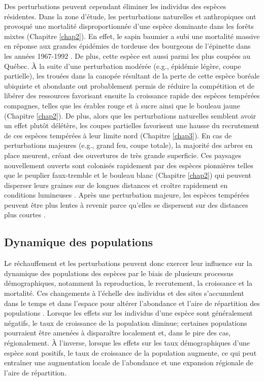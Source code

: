 Des perturbations peuvent cependant éliminer les individus des espèces
résidentes. Dans la zone d'étude, les perturbations naturelles et
anthropiques ont provoqué une mortalité disproportionnée d'une espèce
dominante dans les forêts mixtes (Chapitre \ref{chap2}). En effet, le
sapin baumier a subi une mortalité massive en réponse aux grandes
épidémies de tordeuse des bourgeons de l'épinette dans les années
1967-1992 \citep{duchesne_population_2008}. De plus, cette espèce est
aussi parmi les plus coupées au Québec. À la suite d'une perturbation
modérée (e.g., épidémie légère, coupe partielle), les trouées dans la
canopée résultant de la perte de cette espèce boréale ubiquiste et
abondante ont probablement permis de réduire la compétition et de
libérer des ressources favorisant ensuite la croissance rapide des
espèces tempérées compagnes, telles que les érables rouge et à sucre
ainsi que le bouleau jaune (Chapitre \ref{chap2}). De plus, alors que
les perturbations naturelles semblent avoir un effet plutôt délétère,
les coupes partielles favorisent une hausse du recrutement de ces
espèces tempérées à leur limite nord (Chapitre \ref{chap3}). En cas de
perturbations majeures (e.g., grand feu, coupe totale), la majorité des
arbres en place meurent, créant des ouvertures de très grande
superficie. Ces paysages nouvellement ouverts sont colonisés rapidement
par des espèces pionnières telles que le peuplier faux-tremble et le
bouleau blanc (Chapitre \ref{chap2}) qui peuvent disperser leurs graines
sur de longues distances et croître rapidement en conditions lumineuses
\citep{boucher_fire_2017, grondin_have_2018}. Après une perturbation
majeure, les espèces tempérées peuvent être plus lentes à revenir parce
qu'elles se dispersent sur des distances plus courtes
\citep{scheller_spatially_2005}.

\hypertarget{dynamique-des-populations}{%
\subsection{Dynamique des populations}\label{dynamique-des-populations}}

Le réchauffement et les perturbations peuvent donc exercer leur
influence sur la dynamique des populations des espèces par le biais de
plusieurs processus démographiques, notamment la reproduction, le
recrutement, la croissance et la mortalité. Ces changements à l'échelle
des individus et des sites s'accumulent dans le temps et dans l'espace
pour altérer l'abondance et l'aire de répartition des populations
\citep{holt_theoretical_2005}. Lorsque les effets sur les individus
d'une espèce sont généralement négatifs, le taux de croissance de la
population diminue; certaines populations pourraient être amenées à
disparaître localement et, dans le pire des cas, régionalement. À
l'inverse, lorsque les effets sur les taux démographiques d'une espèce
sont positifs, le taux de croissance de la population augmente, ce qui
peut entraîner une augmentation locale de l'abondance et une expansion
régionale de l'aire de répartition.

